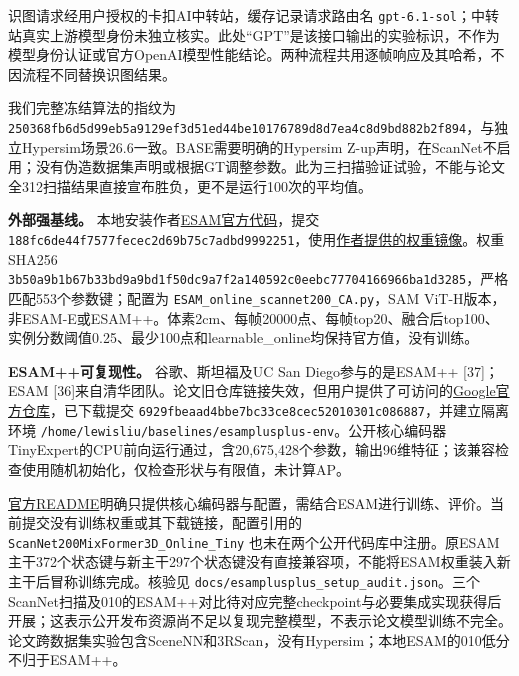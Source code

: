 \documentclass[UTF8,fontset=fandol]{ctexart}
\begin{document}
识图请求经用户授权的卡扣AI中转站，缓存记录请求路由名 \texttt{gpt-6.\allowbreak{}1-sol}；中转站真实上游模型身份未独立核实。此处“GPT”是该接口输出的实验标识，不作为模型身份认证或官方OpenAI模型性能结论。两种流程共用逐帧响应及其哈希，不因流程不同替换识图结果。



我们完整冻结算法的指纹为 \texttt{250368fb6d5d99eb5a9129ef3d51ed44be10176789d8d7ea4c8d9bd882b2f894}，与独立Hypersim场景26.6一致。BASE需要明确的Hypersim Z-up声明，在ScanNet不启用；没有伪造数据集声明或根据GT调整参数。此为三扫描验证试验，不能与论文全312扫描结果直接宣布胜负，更不是运行100次的平均值。



\textbf{外部强基线。} 本地安装作者\href{https://github.com/xuxw98/ESAM}{ESAM官方代码}，提交 \texttt{188fc6de44f7577fecec2d69b75c7adbd9992251}，使用\href{https://huggingface.co/XXXCARREY/EmbodiedSAM}{作者提供的权重镜像}。权重SHA256 \texttt{3b50a9b1b67b33bd9a9bd1f50dc9a7f2a140592c0eebc77704166966ba1d3285}，严格匹配553个参数键；配置为 \texttt{ESAM\_\allowbreak{}online\_\allowbreak{}scannet200\_\allowbreak{}CA.\allowbreak{}py}，SAM ViT-H版本，非ESAM-E或ESAM++。体素2cm、每帧20000点、每帧top20、融合后top100、实例分数阈值0.25、最少100点和learnable\_online均保持官方值，没有训练。



\textbf{ESAM++可复现性。} 谷歌、斯坦福及UC San Diego参与的是ESAM++ [37]；ESAM [36]来自清华团队。论文旧仓库链接失效，但用户提供了可访问的\href{https://github.com/google/esamplusplus}{Google官方仓库}，已下载提交 \texttt{6929fbeaad4bbe7bc33ce8cec52010301c086887}，并建立隔离环境 \texttt{/\allowbreak{}home/\allowbreak{}lewisliu/\allowbreak{}baselines/\allowbreak{}esamplusplus-env}。公开核心编码器TinyExpert的CPU前向运行通过，含20,675,428个参数，输出96维特征；该兼容检查使用随机初始化，仅检查形状与有限值，未计算AP。



\href{https://github.com/google/esamplusplus\#training--evaluation}{官方README}明确只提供核心编码器与配置，需结合ESAM进行训练、评价。当前提交没有训练权重或其下载链接，配置引用的 \texttt{ScanNet200MixFormer3D\_\allowbreak{}Online\_\allowbreak{}Tiny} 也未在两个公开代码库中注册。原ESAM主干372个状态键与新主干297个状态键没有直接兼容项，不能将ESAM权重装入新主干后冒称训练完成。核验见 \texttt{docs/\allowbreak{}esamplusplus\_\allowbreak{}setup\_\allowbreak{}audit.\allowbreak{}json}。三个ScanNet扫描及010的ESAM++对比待对应完整checkpoint与必要集成实现获得后开展；这表示公开发布资源尚不足以复现完整模型，不表示论文模型训练不完全。论文跨数据集实验包含SceneNN和3RScan，没有Hypersim；本地ESAM的010低分不归于ESAM++。
\end{document}
